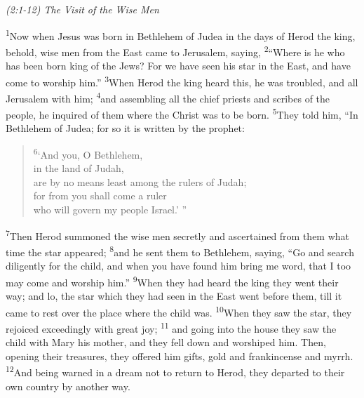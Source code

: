 \documentclass[letterpaper]{report}
\newcommand{\vs}[1]{\textsuperscript{#1}}
\begin{document}
{\centering
\emph{(2:1-12) The Visit of the Wise Men}\\
}
\begin{multicols}{2}
\vs{1}Now when Jesus was born in Bethlehem of Judea in the days of Herod the king,
behold, wise men from the East came to Jerusalem, saying,
\vs{2}``Where is he who has been born king of the Jews?
For we have seen his star in the East, and have come to worship him.''
\vs{3}When Herod the king heard this, he was troubled, and all Jerusalem with him;
\vs{4}and assembling all the chief priests and scribes of the people,
he inquired of them where the Christ was to be born. \vs{5}They told him, ``In Bethlehem of Judea; for so it is written by the prophet:

\begin{verse}
\vs{6}`And you, O Bethlehem,\\
in the land of Judah,\\
are by no means least among the rulers of Judah;\\
for from you shall come a ruler\\
who will govern my people Israel.' ''\\ 
\end{verse}

\vs{7}Then Herod summoned the wise men secretly and ascertained from them what
time the star appeared;
\vs{8}and he sent them to Bethlehem, saying,
``Go and search diligently for the child,
and when you have found him bring me word,
that I too may come and worship him.''
\vs{9}When they had heard the king they went their way;
and lo, the star which they had seen in the East went before them,
till it came to rest over the place where the child was.
\vs{10}When they saw the star, they rejoiced exceedingly with great joy;
\vs{11} and going into the house they saw the child with Mary his mother,
and they fell down and worshiped him.
Then, opening their treasures, they offered him gifts,
gold and frankincense and myrrh.
\vs{12}And being warned in a dream not to return to Herod,
they departed to their own country by another way.
\end{multicols}
\end{document}
